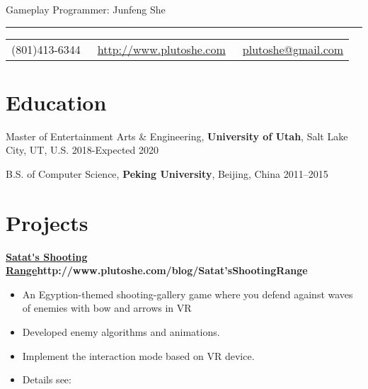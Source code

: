 \documentclass{article}
\begin{document}
	
	\color{text1} %
	
	\par{\centering
		{\sffamily\huge Gameplay Programmer: Junfeng She
		}\\	
		{\color{headings} \par}
		{\color{white} \hrule} %
		
		\vspace{10pt}
		
		\colorbox{mygrey}{\textcolor{text1}{
				\begin{tabular}{c|c|c}
					\raisebox{-2pt}{\Phone} (801)413-6344 &
					\raisebox{-2pt}{\Envelope} ~\href{http://www.plutoshe.com}{http://www.plutoshe.com}	 &	 \raisebox{0pt}{\textbf{@}}
					~\href{mailto:plutoshe@gmail.com}{plutoshe@gmail.com}
				\end{tabular}
			}
		}
		\vspace{10pt}
		
		\section{Education}
		\vspace{5pt}
		Master of Entertainment Arts \& Engineering, \textbf{University of Utah}, Salt Lake City, UT, U.S. \hfill 2018-Expected 2020
		\vspace{5pt}
		
		B.S. of Computer Science, \textbf{Peking University}, Beijing, China \hfill 2011--2015
		\vspace{10pt}
		
		\section{Projects}
		\vspace{5pt}
		
		\textbf{\url{Satat's Shooting Range}{http://www.plutoshe.com/blog/Satat'sShootingRange}} \hfill \quad
		
		\begin{itemize}
			\item An Egyption-themed shooting-gallery game where you defend against waves of enemies with bow and arrows in VR
			\item Developed enemy algorithms and animations.
			\item Implement the interaction mode based on VR device.
			\item Details see: 
		\end{itemize}
		
}
\end{document}
